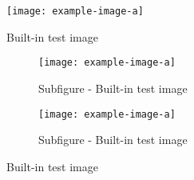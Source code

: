 \begin{figure}[htb]
    \centering
    \texttt{[image: example-image-a]}
    \caption{Built-in test image}\label{F:test-a}
\end{figure}

\begin{figure}[htb]
    \centering
    \begin{subfigure}[t]{.45\linewidth}
        \centering
        \texttt{[image: example-image-a]}
        \caption{Subfigure - Built-in test image}\label{F:test-b-sub-a}
    \end{subfigure}
    \begin{subfigure}[t]{.45\linewidth}
        \centering
        \texttt{[image: example-image-a]}
        \caption{Subfigure - Built-in test image}\label{F:test-b-sub-b}
    \end{subfigure}
    \caption{Built-in test image}\label{F:test-b}
\end{figure}
